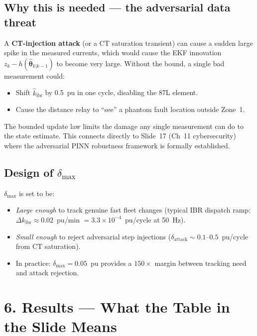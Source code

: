 \documentclass[12pt,a4paper]{article}
\begin{document}
\subsection{Why this is needed — the adversarial data threat}

A \textbf{CT-injection attack} (or a CT saturation transient) can cause a sudden
large spike in the measured currents, which would cause the EKF innovation
$z_k - h(\hat{\boldsymbol{\theta}}_{k|k-1})$ to become very large. Without the
bound, a single bad measurement could:
\begin{itemize}[nosep]
  \item Shift $\hat{k}_\mathrm{ibr}$ by 0.5~pu in one cycle, disabling the 87L element.
  \item Cause the distance relay to ``see'' a phantom fault location outside Zone~1.
\end{itemize}
The bounded update law limits the damage any single measurement can do to the
state estimate. This connects directly to Slide~17 (Ch~11 cybersecurity) where the
adversarial PINN robustness framework is formally established.

\subsection{Design of $\delta_\mathrm{max}$}

$\delta_\mathrm{max}$ is set to be:
\begin{itemize}[nosep]
  \item \emph{Large enough} to track genuine fast fleet changes
        (typical IBR dispatch ramp: $\Delta k_\mathrm{ibr} \approx 0.02$~pu/min
        $= 3.3 \times 10^{-4}$~pu/cycle at 50~Hz).
  \item \emph{Small enough} to reject adversarial step injections
        ($\delta_\mathrm{attack} \sim 0.1$--$0.5$~pu/cycle from CT saturation).
  \item In practice: $\delta_\mathrm{max} = 0.05$~pu provides a $150\times$ margin
        between tracking need and attack rejection.
\end{itemize}

\section{6.\; Results — What the Table in the Slide Means}
\end{document}

